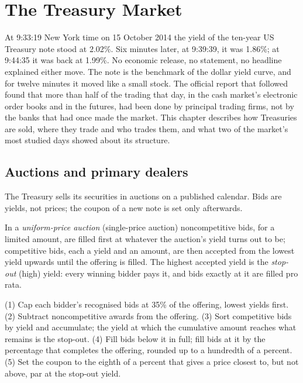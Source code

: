 \chapter{The Treasury Market}\label{ch:m2:the-treasury-market}

At 9:33:19 New York time on 15 October 2014 the yield of the ten-year US
Treasury note stood at 2.02\%. Six minutes later, at 9:39:39, it was 1.86\%;
at 9:44:35 it was back at 1.99\%. No economic release, no statement, no
headline explained either move. The note is the benchmark of the dollar
yield curve, and for twelve minutes it moved like a small stock. The official report that followed found that more
than half of the trading that day, in the cash market's electronic order
books and in the futures, had been done by principal trading firms, not by
the banks that had once made the market. This chapter describes how
Treasuries are sold, where they trade and who trades them, and what two of
the market's most studied days showed about its structure.

\section{Auctions and primary dealers}

The Treasury sells its securities in auctions on a published calendar. Bids
are yields, not prices; the coupon of a new note is set only afterwards.

\begin{definition}\label{def:m2:the-treasury-market:auction}
In a \emph{uniform-price auction} (single-price
auction) noncompetitive bids, for a limited amount, are filled first at
whatever the auction's yield turns out to be; competitive bids, each a yield
and an amount, are then accepted from the lowest yield upwards until the
offering is filled. The highest accepted yield is the \emph{stop-out} (high)
yield: every winning bidder pays it, and bids exactly at it are filled pro
rata.
\end{definition}

\begin{method}\label{met:m2:the-treasury-market:run}
(1) Cap each bidder's recognised bids at 35\% of the offering, lowest yields
first. (2) Subtract noncompetitive awards from the offering. (3) Sort
competitive bids by yield and accumulate; the yield at which the cumulative
amount reaches what remains is the stop-out. (4) Fill bids below it in full;
fill bids at it by the percentage that completes the offering, rounded up to
a hundredth of a percent. (5) Set the coupon to the eighth of a percent that
gives a price closest to, but not above, par at the stop-out yield.
\end{method}

